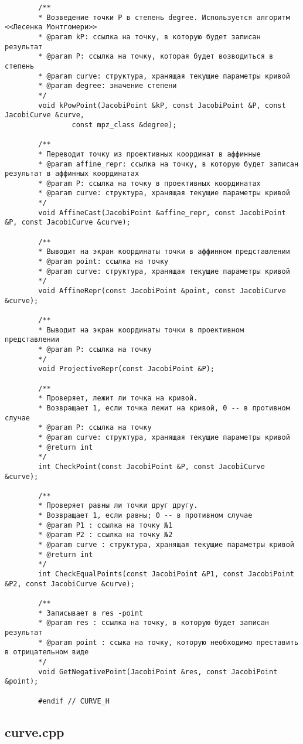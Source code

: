\documentclass[a4paper,12pt]{article}
\begin{document}
\begin{verbatim}
		/**
		* Возведение точки Р в степень degree. Используется алгоритм <<Лесенка Монтгомери>>
		* @param kP: ссылка на точку, в которую будет записан результат
		* @param P: ссылка на точку, которая будет возводиться в степень
		* @param curve: структура, хранящая текущие параметры кривой
		* @param degree: значение степени
		*/
		void kPowPoint(JacobiPoint &kP, const JacobiPoint &P, const JacobiCurve &curve, 
				const mpz_class &degree);
		
		/**
		* Переводит точку из проективных координат в аффинные
		* @param affine_repr: ссылка на точку, в которую будет записан результат в аффинных координатах
		* @param P: ссылка на точку в проективных координатах
		* @param curve: структура, хранящая текущие параметры кривой
		*/
		void AffineCast(JacobiPoint &affine_repr, const JacobiPoint &P, const JacobiCurve &curve);
		
		/**
		* Выводит на экран координаты точки в аффинном представлении
		* @param point: ссылка на точку
		* @param curve: структура, хранящая текущие параметры кривой
		*/
		void AffineRepr(const JacobiPoint &point, const JacobiCurve &curve);
		
		/**
		* Выводит на экран координаты точки в проективном представлении
		* @param P: ссылка на точку
		*/
		void ProjectiveRepr(const JacobiPoint &P);
		
		/**
		* Проверяет, лежит ли точка на кривой.
		* Возвращает 1, если точка лежит на кривой, 0 -- в противном случае
		* @param P: ссылка на точку
		* @param curve: структура, хранящая текущие параметры кривой
		* @return int
		*/
		int CheckPoint(const JacobiPoint &P, const JacobiCurve &curve);
		
		/**
		* Проверяет равны ли точки друг другу.
		* Возвращает 1, если равны; 0 -- в противном случае
		* @param P1 : ссылка на точку №1
		* @param P2 : ссылка на точку №2
		* @param curve : структура, хранящая текущие параметры кривой
		* @return int
		*/
		int CheckEqualPoints(const JacobiPoint &P1, const JacobiPoint &P2, const JacobiCurve &curve);
		
		/**
		* Записывает в res -point
		* @param res : ссылка на точку, в которую будет записан результат
		* @param point : ссыка на точку, которую необходимо преставить в отрицательном виде
		*/
		void GetNegativePoint(JacobiPoint &res, const JacobiPoint &point);
		
		#endif // CURVE_H
	\end{verbatim}

	\subsection{curve.cpp}
\end{document}
